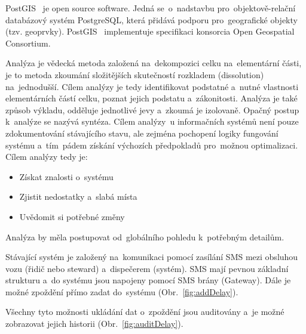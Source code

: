 PostGIS~\cite{postgis} je open source software. Jedná se~o~nadstavbu pro~objektově-relační databázový systém PostgreSQL, která přidává podporu pro~geografické objekty~\cite{arcgis} (tzv. geoprvky). PostGIS~\cite{postgis2} implementuje specifikaci  konsorcia Open Geospatial Consortium.




Analýza je vědecká metoda založená na~dekompozici celku na~elementární části, je to metoda
zkoumání složitějších skutečností rozkladem (dissolution) na~jednodušší. Cílem analýzy je tedy identifikovat podstatné a~nutné vlastnosti elementárních částí celku, poznat jejich podstatu a~zákonitosti. Analýza je také způsob výkladu, odděluje jednotlivé jevy a~zkoumá je izolovaně. Opačný postup k~analýze se nazývá syntéza. Cílem analýzy~u informačních systémů není pouze zdokumentování stávajícího stavu, ale zejména pochopení logiky fungování systému a~tím~pádem získání výchozích předpokladů pro~možnou optimalizaci.
Cílem analýzy tedy je:
\begin{itemize}
	\setlength{\parskip}{0pt}
	\setlength{\itemsep}{0pt}
	\item Získat znalosti o~systému
	\item Zjistit nedostatky a~slabá místa
	\item Uvědomit si potřebné změny
\end{itemize}
Analýza by měla postupovat od~globálního pohledu k~potřebným detailům.


Stávající systém je založený na~komunikaci pomocí zasílání SMS mezi obsluhou vozu (řidič nebo steward) a~dispečerem (systém). SMS mají pevnou základní strukturu a~do systému jsou napojeny pomocí SMS brány (Gateway). Dále je možné zpoždění přímo zadat do~systému (Obr.~\ref{fig:addDelay}).

Všechny tyto možnosti ukládání dat o~zpoždění jsou auditovány a~je možné zobrazovat jejich historii (Obr.~\ref{fig:auditDelay}).


